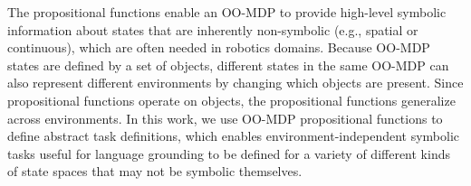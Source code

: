 \documentclass[conference]{IEEEtran}
\newcommand{\stnote}[1]{\textcolor{Blue}{\textbf{ST: #1}}}
\begin{document}
The propositional functions enable an OO-MDP to provide high-level symbolic information about states that are inherently non-symbolic (e.g., spatial or continuous), which are often needed in robotics domains. Because OO-MDP states are defined by a set of objects, different states in the same OO-MDP can also represent different environments by changing which objects are present. Since propositional functions operate on objects, the propositional functions generalize across environments. In this work, we use OO-MDP propositional functions to define abstract task definitions, which enables environment-independent symbolic tasks useful for language grounding to be defined for a variety of different kinds of state spaces that may not be symbolic themselves.








\end{document}
